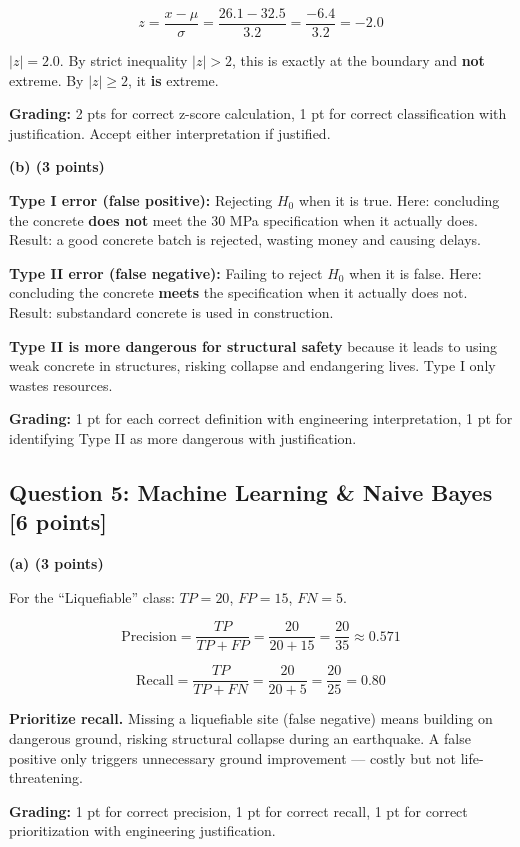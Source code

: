 \documentclass[11pt,a4paper]{article}
\begin{document}
\begin{answerbox}
$$z = \frac{x - \mu}{\sigma} = \frac{26.1 - 32.5}{3.2} = \frac{-6.4}{3.2} = -2.0$$

$|z| = 2.0$. By strict inequality $|z| > 2$, this is exactly at the boundary and \textbf{not} extreme. By $|z| \geq 2$, it \textbf{is} extreme.

\textbf{Grading:} 2 pts for correct z-score calculation, 1 pt for correct classification with justification. Accept either interpretation if justified.
\end{answerbox}

\vspace{0.3cm}

\noindent\textbf{(b) (3 points)}

\begin{answerbox}
\textbf{Type I error (false positive):} Rejecting $H_0$ when it is true. Here: concluding the concrete \textbf{does not} meet the 30 MPa specification when it actually does. Result: a good concrete batch is rejected, wasting money and causing delays.

\textbf{Type II error (false negative):} Failing to reject $H_0$ when it is false. Here: concluding the concrete \textbf{meets} the specification when it actually does not. Result: substandard concrete is used in construction.

\textbf{Type II is more dangerous for structural safety} because it leads to using weak concrete in structures, risking collapse and endangering lives. Type I only wastes resources.

\textbf{Grading:} 1 pt for each correct definition with engineering interpretation, 1 pt for identifying Type II as more dangerous with justification.
\end{answerbox}

\newpage
\subsection*{Question 5: Machine Learning \& Naive Bayes [6 points]}

\noindent\textbf{(a) (3 points)}

\begin{answerbox}
For the ``Liquefiable'' class: $TP = 20$, $FP = 15$, $FN = 5$.

$$\text{Precision} = \frac{TP}{TP + FP} = \frac{20}{20 + 15} = \frac{20}{35} \approx 0.571$$

$$\text{Recall} = \frac{TP}{TP + FN} = \frac{20}{20 + 5} = \frac{20}{25} = 0.80$$

\textbf{Prioritize recall.} Missing a liquefiable site (false negative) means building on dangerous ground, risking structural collapse during an earthquake. A false positive only triggers unnecessary ground improvement --- costly but not life-threatening.

\textbf{Grading:} 1 pt for correct precision, 1 pt for correct recall, 1 pt for correct prioritization with engineering justification.
\end{answerbox}
\end{document}
